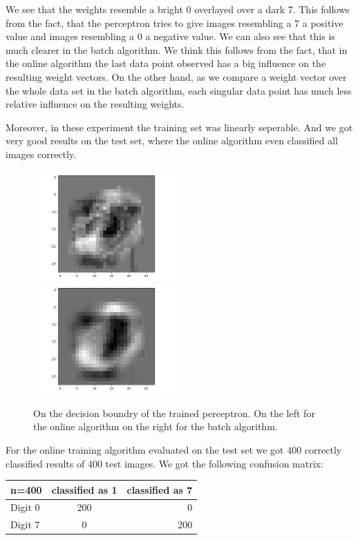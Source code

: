 We see that the weights resemble a bright 0 overlayed over a dark 7. This follows from the fact, that the perceptron tries to give images resembling a 7 a positive value and images resembling a 0 a negative value. We can also see that this is much clearer in the batch algorithm. We think this follows from the fact, that in the online algorithm the last data point observed has a big influence on the resulting weight vectors. On the other hand, as we compare a weight vector over the whole data set in the batch algorithm, each singular data point has much less relative influence on the resulting weights.

Moreover, in these experiment the training set was linearly seperable. And we got very good results on the test set, where the online algorithm even classified all images correctly. 

\begin{figure}
\includegraphics[width = 0.5\textwidth]{figures/weights_image_online}
\includegraphics[width = 0.5\textwidth]{figures/weights_image_batch}
\caption{On the decision boundry of the trained perceptron. On the left for the online algorithm on the right for the batch algorithm.}
\label{perceptron:decision:5d}
\end{figure}

For the online training algorithm evaluated on the test set we got 400 correctly classified results of 400 test images. We got the following confusion matrix:

\begin{tabular}{ l | c | r }
\centering
  n=400 & classified as 1 & classified as 7 \\ \hline
  Digit 0 & 200 & 0 \\
  Digit 7 & 0 & 200 \\
\end{tabular}


